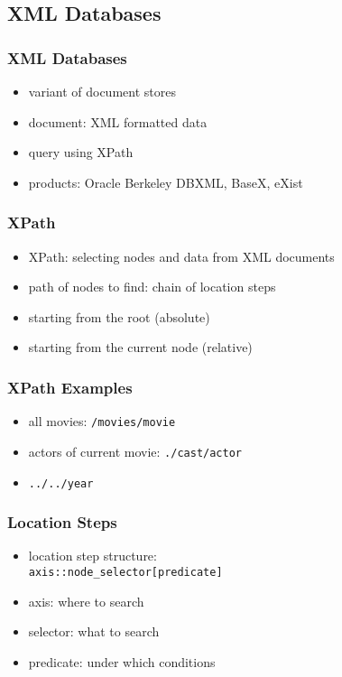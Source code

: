 \documentclass[dvipsnames]{beamer}
\theoremstyle{plain}
\begin{document}
\subsection{XML Databases}

\begin{frame}
  \frametitle{XML Databases}

  \begin{itemize}
    \item variant of document stores
    \item document: XML formatted data

    \medskip
    \item query using XPath

    \bigskip
    \item products: Oracle Berkeley DBXML, BaseX, eXist
  \end{itemize}
\end{frame}

\begin{frame}
  \frametitle{XPath}

  \begin{itemize}
    \item XPath: selecting nodes and data from XML documents

    \medskip
    \item path of nodes to find: chain of location steps
    \item starting from the root (absolute)
    \item starting from the current node (relative)
  \end{itemize}
\end{frame}

\begin{frame}
  \frametitle{XPath Examples}

  \begin{itemize}
    \item all movies: \lstinline|/movies/movie|
    \item actors of current movie: \lstinline|./cast/actor|
    \item \lstinline|../../year|
  \end{itemize}
\end{frame}

\begin{frame}
  \frametitle{Location Steps}

  \begin{itemize}
    \item location step structure:\\
      \lstinline|axis::node_selector[predicate]|

    \medskip
    \item axis: where to search
    \item selector: what to search
    \item predicate: under which conditions
  \end{itemize}
\end{frame}
\end{document}
